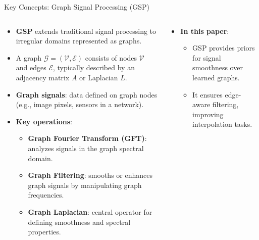 \documentclass[aspectratio=169,xcolor=dvipsnames]{beamer}
\begin{document}
\begin{frame}{Key Concepts: Graph Signal Processing (GSP)}

\begin{columns}[c]

\begin{column}{0.60\textwidth}

\begin{itemize}
    \item \textbf{GSP} extends traditional signal processing to irregular domains represented as graphs.
    
    \item A graph $\mathcal{G} = (\mathcal{V}, \mathcal{E})$ consists of nodes $\mathcal{V}$ and edges $\mathcal{E}$, typically described by an adjacency matrix $A$ or Laplacian $L$.
    
    \vspace{0.3cm}
    
    \item \textbf{Graph signals}: data defined on graph nodes (e.g., image pixels, sensors in a network).

    \vspace{0.3cm}
    
    \item \textbf{Key operations}:
    \begin{itemize}
        \item \textbf{Graph Fourier Transform (GFT)}: analyzes signals in the graph spectral domain.
        \item \textbf{Graph Filtering}: smooths or enhances graph signals by manipulating graph frequencies.
        \item \textbf{Graph Laplacian}: central operator for defining smoothness and spectral properties.
    \end{itemize}

    \vspace{0.3cm}

\end{itemize}

\end{column}

\begin{column}{0.45\textwidth}

\begin{itemize}
    \item \textbf{In this paper}:
    \begin{itemize}
        \item GSP provides priors for signal smoothness over learned graphs.
        \item It ensures edge-aware filtering, improving interpolation tasks.
    \end{itemize}
    

\end{itemize}
\end{column}
\end{columns}
\end{frame}
\end{document}
